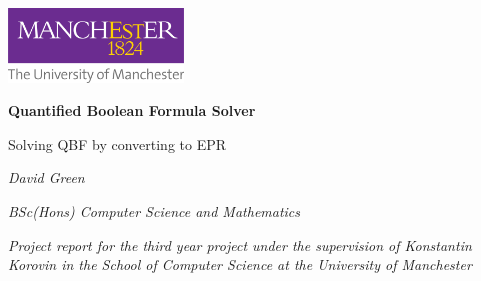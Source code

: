 \begin{titlepage}
\centering
\includegraphics[width=0.35\textwidth]{png/UniOfManchesterLogo}
\par
\vspace{1cm}
{\huge\bfseries Quantified Boolean Formula Solver\par}
\vspace{1cm}
{\Large Solving QBF by converting to EPR\par}
\vspace{2cm}
{\textit{David Green}\par}
{\textit{BSc(Hons) Computer Science and Mathematics}\par}
{\textit{Project report for the third year project under the supervision of Konstantin Korovin in the School of Computer Science at the University of Manchester}\par}
\vfill
{\large \monthyear{} \par}
\end{titlepage}
